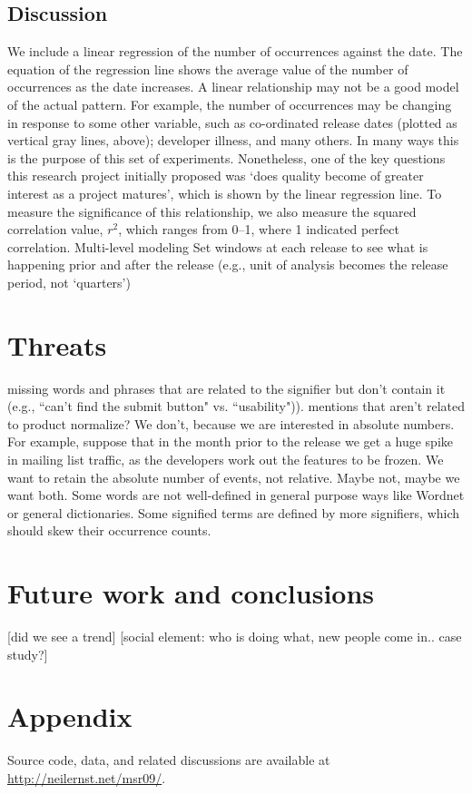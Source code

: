 \documentclass[conference, compsoc]{IEEEtran}
\begin{document}
\subsection{Discussion}
We include a linear regression of the number of occurrences against the date. The equation of the regression line shows the average value of the number of occurrences as the date increases. A linear relationship may not be a good model of the actual pattern. For example, the number of occurrences may be changing in response to some other variable, such as co-ordinated release dates (plotted as vertical gray lines, above); developer illness, and many others. In many ways this is the purpose of this set of experiments. Nonetheless, one of the key questions this research project initially proposed was `does quality become of greater interest as a project matures', which is shown by the linear regression line. To measure the significance of this relationship, we also measure the squared correlation value, $r^2$, which ranges from 0--1, where 1 indicated perfect correlation.
Multi-level modeling
Set windows at each release to see what is happening prior and after the release (e.g., unit of analysis becomes the release period, not `quarters')
\section{Threats}
missing words and phrases that are related to the signifier but don't contain it (e.g., ``can't find the submit button" vs. ``usability")). 
mentions that aren't related to product
normalize? We don't, because we are interested in absolute numbers. For example, suppose that in the month prior to the release we get a huge spike in mailing list traffic, as the developers work out the features to be frozen. We want to retain the absolute number of events, not relative. Maybe not, maybe we want both.
Some words are not well-defined in general purpose ways like Wordnet or general dictionaries.
Some signified terms are defined by more signifiers, which should skew their occurrence counts.
\section{Future work and conclusions}
[did we see a trend]
[social element: who is doing what, new people come in.. case study?]
\section{Appendix}
Source code, data, and related discussions are available at \url{http://neilernst.net/msr09/}.
\begin{footnotesize}

\end{footnotesize}
\end{document}
